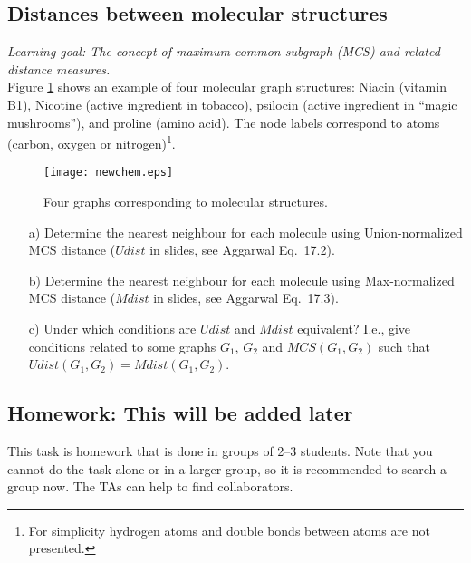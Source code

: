 \documentclass[a4paper,12pt]{article}
\newcommand{\Udist}{\ensuremath{\mathit{Udist}}}
\newcommand{\Mdist}{\ensuremath{\mathit{Mdist}}}
\newcommand{\MCS}{\ensuremath{\mathit{MCS}}}
\begin{document}
\subsection{Distances between molecular structures}

{\em Learning goal: The concept of maximum common subgraph (MCS) and related distance measures.}\\

Figure \ref{comp} shows an example of four molecular graph structures:
Niacin (vitamin B1), Nicotine (active ingredient in tobacco), psilocin
(active ingredient in ``magic mushrooms''), and proline (amino acid).
The node labels correspond to atoms (carbon, oxygen or
nitrogen)\footnote{For simplicity hydrogen atoms and double bonds
  between atoms are not presented.}.

\begin{figure}[!h]
\begin{center}
\texttt{[image: newchem.eps]}
\caption{Four graphs corresponding to molecular structures.}
\label{comp}
\end{center}
\end{figure}

\begin{itemize}
\item[a)] Determine the nearest neighbour for each molecule using Union-normalized MCS distance ($\Udist$ in slides, see Aggarwal Eq.~17.2).
\item[b)] Determine the nearest neighbour for each molecule using Max-normalized MCS distance ($\Mdist$ in slides, see Aggarwal Eq.~17.3).
\item[c)] Under which conditions are $\Udist$ and $\Mdist$ equivalent? I.e., give conditions related to some graphs $G_1$, $G_2$ and $\MCS(G_1,G_2)$ such that $\Udist(G_1,G_2)=\Mdist(G_1,G_2)$.
\end{itemize}


\newpage
\subsection{Homework: This will be added later}

This task is homework that is done in groups of 2--3 students.  Note
that you cannot do the task alone or in a larger group, so it is
recommended to search a group now. The TAs can help to find collaborators.






% 
\end{document}
